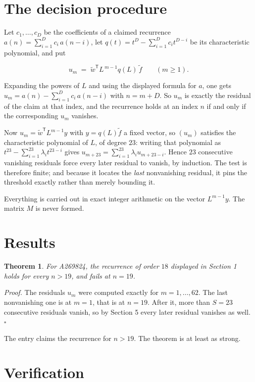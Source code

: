 \documentclass[11pt]{article}
\newtheorem{theorem}{Theorem}
\theoremstyle{definition}
\begin{document}
\section{The decision procedure}

Let $c_1,\dots,c_D$ be the coefficients of a claimed recurrence $a(n) = \sum_{i=1}^{D} c_i\,a(n-i)$, let $q(t) = t^{D} - \sum_{i=1}^{D} c_i t^{D-i}$ be its characteristic polynomial, and put

\[u_m \;=\; \tilde w^{\mathsf T} L^{\,m-1} q(L)\,\tilde f \qquad (m \ge 1).\]

Expanding the powers of $L$ and using the displayed formula for $a$, one gets $u_m = a(n) - \sum_{i=1}^{D} c_i\,a(n-i)$ with $n = m + D$. So $u_m$ is exactly the residual of the claim at that index, and the recurrence holds at an index $n$ if and only if the corresponding $u_m$ vanishes.

Now $u_m = \tilde w^{\mathsf T} L^{m-1} y$ with $y = q(L)\tilde f$ a fixed vector, so $(u_m)$ satisfies the characteristic polynomial of $L$, of degree $23$: writing that polynomial as $t^{23} - \sum_{i=1}^{23} \lambda_i t^{23-i}$ gives $u_{m+23} = \sum_{i=1}^{23} \lambda_i u_{m+23-i}$. Hence $23$ consecutive vanishing residuals force every later residual to vanish, by induction. The test is therefore finite; and because it locates the {\itshape last} nonvanishing residual, it pins the threshold exactly rather than merely bounding it.

Everything is carried out in exact integer arithmetic on the vector $L^{m-1}y$. The matrix $M$ is never formed.

\section{Results}

\begin{theorem} For A269824, the recurrence of order $18$ displayed in Section 1 holds for every $n > 19$, and fails at $n = 19$.\end{theorem}

{\itshape Proof.} The residuals $u_m$ were computed exactly for $m = 1,\dots,62$. The last nonvanishing one is at $m = 1$, that is at $n = 19$. After it, more than $S = 23$ consecutive residuals vanish, so by Section 5 every later residual vanishes as well. $\square$

The entry claims the recurrence for $n > 19$. The theorem is at least as strong.

\section{Verification}
\end{document}
